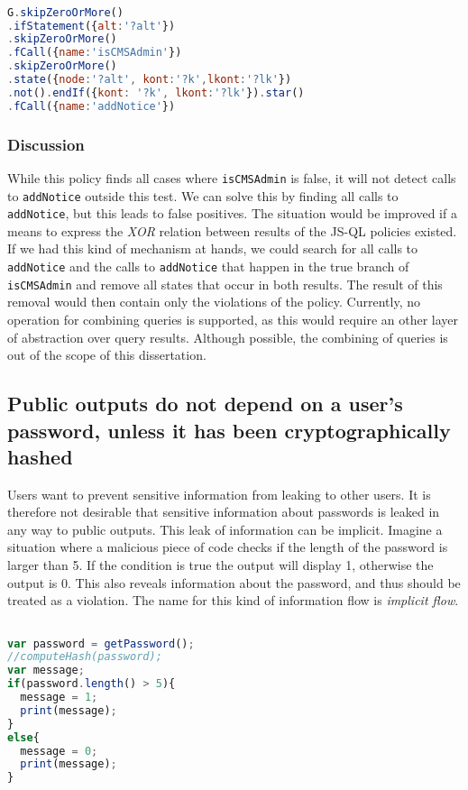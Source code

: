 \begin{lstlisting}[label={lst:Policy4JSQL},language=JavaScript,caption=Policy 4 in JS-QL]  % float=t?

G.skipZeroOrMore()
.ifStatement({alt:'?alt'})
.skipZeroOrMore()
.fCall({name:'isCMSAdmin'})
.skipZeroOrMore()
.state({node:'?alt', kont:'?k',lkont:'?lk'})
.not().endIf({kont: '?k', lkont:'?lk'}).star()
.fCall({name:'addNotice'})
\end{lstlisting}

\subsubsection*{Discussion}
While this policy finds all cases where \texttt{isCMSAdmin} is false, it will not detect calls to \texttt{addNotice} outside this test. We can solve this by finding all calls to \texttt{addNotice}, but this leads to false positives. The situation would be improved if a means to express the \textit{XOR} relation between results of the JS-QL policies existed. If we had this kind of mechanism at hands, we could search for all calls to \texttt{addNotice} and the calls to \texttt{addNotice} that happen in the true branch of \texttt{isCMSAdmin} and remove all states that occur in both results. The result of this removal would then contain only the violations of the policy. Currently, no operation for combining queries is supported, as this would require an other layer of abstraction over query results. Although possible, the combining of queries is out of the scope of this dissertation.

\subsection{Public outputs do not depend on a user's password, unless it has been cryptographically hashed}


Users want to prevent sensitive information from leaking to other users. It is therefore not desirable that sensitive information about passwords is leaked in any way to public outputs. This leak of information can be implicit. Imagine a situation where a malicious piece of code checks if the length of the password is larger than 5. If the condition is true the output will display 1, otherwise the output is 0. This also reveals information about the password, and thus should be treated as a violation. The name for this kind of information flow is \textit{implicit flow}.

\begin{lstlisting}[label={lst:PWDepends},language=JavaScript,caption=The output depends on the password example,mathescape=true]  % float=t?

var password = getPassword();
//computeHash(password);
var message;
if(password.length() > 5){
  message = 1;
  print(message);
}
else{
  message = 0;
  print(message);
}
\end{lstlisting}

